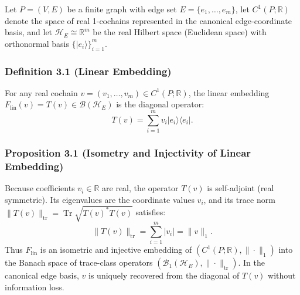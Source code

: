 \documentclass[
  10pt,
]{article}
\begin{document}
Let \protect\hypertarget{math-E0038-0039}{}{\(P = (V, E)\)} be a finite graph with edge set \protect\hypertarget{math-E0039-0040}{}{\(E = \{e_1, \dots, e_m\}\)}, let \protect\hypertarget{math-E0040-0041}{}{\(C^1(P; \mathbb{R})\)} denote the space of real 1-cochains represented in the canonical edge-coordinate basis, and let \protect\hypertarget{math-E0041-0042}{}{\(\mathcal{H}_E \cong \mathbb{R}^m\)} be the real Hilbert space (Euclidean space) with orthonormal basis \protect\hypertarget{math-E0042-0043}{}{\(\{|e_i\rangle\}_{i=1}^m\)}.

\subsubsection{Definition 3.1 (Linear Embedding)}\label{definition-3.1-linear-embedding}

For any real cochain \protect\hypertarget{math-E0043-0044}{}{\(v = (v_1, \dots, v_m) \in C^1(P; \mathbb{R})\)}, the linear embedding \protect\hypertarget{math-E0044-0045}{}{\(F_{\mathrm{lin}}(v) = T(v) \in \mathcal{B}(\mathcal{H}_E)\)} is the diagonal operator: \protect\hypertarget{math-E0045-0046}{}{\[T(v) = \sum_{i=1}^m v_i |e_i\rangle \langle e_i|.\]}

\subsubsection{Proposition 3.1 (Isometry and Injectivity of Linear Embedding)}\label{proposition-3.1-isometry-and-injectivity-of-linear-embedding}

Because coefficients \protect\hypertarget{math-E0046-0047}{}{\(v_i \in \mathbb{R}\)} are real, the operator \protect\hypertarget{math-E0047-0048}{}{\(T(v)\)} is self-adjoint (real symmetric). Its eigenvalues are the coordinate values \protect\hypertarget{math-E0048-0049}{}{\(v_i\)}, and its trace norm \protect\hypertarget{math-E0049-0050}{}{\(\|T(v)\|_{\mathrm{tr}} = \operatorname{Tr}\sqrt{T(v)^* T(v)}\)} satisfies: \protect\hypertarget{math-E0050-0051}{}{\[\|T(v)\|_{\mathrm{tr}} = \sum_{i=1}^m |v_i| = \|v\|_1.\]} Thus \protect\hypertarget{math-E0004-0052}{}{\(F_{\mathrm{lin}}\)} is an isometric and injective embedding of \protect\hypertarget{math-E0051-0053}{}{\((C^1(P; \mathbb{R}), \|\cdot\|_1)\)} into the Banach space of trace-class operators \protect\hypertarget{math-E0052-0054}{}{\((\mathcal{B}_1(\mathcal{H}_E), \|\cdot\|_{\mathrm{tr}})\)}. In the canonical edge basis, \protect\hypertarget{math-E0053-0055}{}{\(v\)} is uniquely recovered from the diagonal of \protect\hypertarget{math-E0047-0056}{}{\(T(v)\)} without information loss.
\end{document}
